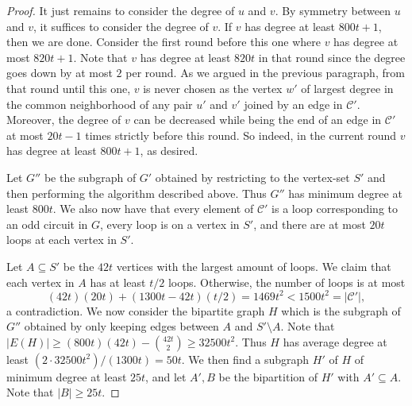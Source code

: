 \documentclass{article}
\theoremstyle{definition}
\begin{document}
\begin{proof}
    It just remains to consider the degree of $u$ and $v$. By symmetry between $u$ and $v$, it suffices to consider the degree of $v$. If $v$ has degree at least $800t+1$, then we are done. Consider the first round before this one where $v$ has degree at most $820t+1$. Note that $v$ has degree at least $820t$ in that round since the degree goes down by at most $2$ per round. As we argued in the previous paragraph, from that round until this one, $v$ is never chosen as the vertex $w'$ of largest degree in the common neighborhood of any pair $u'$ and $v'$ joined by an edge in $\mathcal{C}'$. Moreover, the degree of $v$ can be decreased while being the end of an edge in $\mathcal{C}'$ at most $20t-1$ times strictly before this round. So indeed, in the current round $v$ has degree at least $800t+1$, as desired.

    Let $G''$ be the subgraph of $G'$ obtained by restricting to the vertex-set $S'$ and then performing the algorithm described above. Thus $G''$ has minimum degree at least $800t$. We also now have that every element of $\mathcal{C}'$ is a loop corresponding to an odd circuit in $G$, every loop is on a vertex in $S'$, and there are at most $20t$ loops at each vertex in $S'$.

    Let $A \subseteq S'$ be the $42t$ vertices with the largest amount of loops. We claim that each vertex in $A$ has at least $t/2$ loops. Otherwise, the number of loops is at most 
    $$(42t)(20t)+(1300t-42t)(t/2)=1469t^2<1500t^2=|\mathcal{C}'|,$$
    a contradiction. We now consider the bipartite graph $H$ which is the subgraph of $G''$ obtained by only keeping edges between $A$ and $S' \setminus A$. Note that $|E(H)| \geq (800t)(42t) - \binom{42t}{2} \geq 32500t^2$. Thus $H$ has average degree at least $(2 \cdot 32500t^2)/(1300t) = 50t$. We then find a subgraph $H'$ of $H$ of minimum degree at least $25t$, and let $A',B$ be the bipartition of $H'$ with $A' \subseteq A$. Note that $|B| \geq 25t$.


\end{proof}
\end{document}
